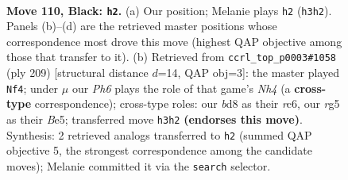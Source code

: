\documentclass[11pt]{article}
\begin{document}
\begin{figure}[p]\centering
\begin{subfigure}{0.46\textwidth}\centering
\resizebox{\linewidth}{!}{%
\newchessgame
\chessboard[
  setfen={3B4/1k6/8/3N2R1/1K6/7p/8/8 b - - 1 110},
  showmover=false,
  pgfstyle=straightmove, color=movearrow, markmove={h3-h2}
]}
\caption{}
\end{subfigure}\hfill
\begin{subfigure}{0.46\textwidth}\centering
\resizebox{\linewidth}{!}{%
\newchessgame
\chessboard[
  setfen={8/8/2R5/1K2b2n/8/1k1B4/8/8 b - - 50 105},
  showmover=false,
  pgfstyle=straightmove, color=movearrow, markmove={h5-f4}
]}
\caption{}
\end{subfigure}
\\[4pt]

\caption{\textbf{Move 110, Black: \texttt{h2}.} (a) Our position; Melanie plays \texttt{h2} (\texttt{h3h2}). Panels (b)--(d) are the retrieved master positions whose correspondence most drove this move (highest QAP objective among those that transfer to it). (b) Retrieved from \texttt{ccrl\_top\_p0003\#1058} (ply 209) [structural distance $d$=14, QAP obj=3]: the master played \texttt{Nf4}; under $\mu$ our \emph{Ph6} plays the role of that game's \emph{Nh4} (a \textbf{cross-type} correspondence); cross-type roles: our \emph{b}d8 as their \emph{r}c6, our \emph{r}g5 as their \emph{B}e5; transferred move \texttt{h3h2} \textbf{(endorses this move)}. Synthesis: 2 retrieved analogs transferred to \texttt{h2} (summed QAP objective 5, the strongest correspondence among the candidate moves); Melanie committed it via the \texttt{search} selector.}
\label{fig:thought-m219}
\end{figure}

\clearpage
\end{document}

